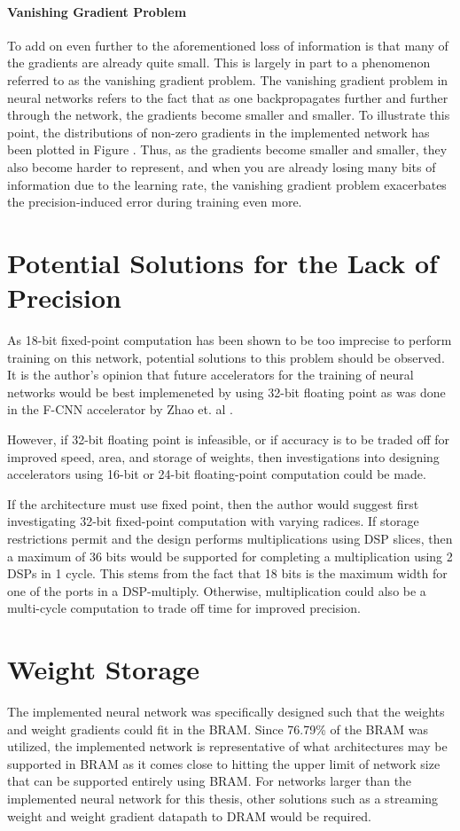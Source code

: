 \paragraph{Vanishing Gradient Problem}
To add on even further to the aforementioned loss of information is that many of the gradients are already quite small. This is largely in part to a phenomenon referred to as the vanishing gradient problem. The vanishing gradient problem in neural networks refers to the fact that as one backpropagates further and further through the network, the gradients become smaller and smaller. To illustrate this point, the distributions of non-zero gradients in the implemented network has been plotted in Figure . Thus, as the gradients become smaller and smaller, they also become harder to represent, and when you are already losing many bits of information due to the learning rate, the vanishing gradient problem exacerbates the precision-induced error during training even more.

\section{Potential Solutions for the Lack of Precision}
As 18-bit fixed-point computation has been shown to be too imprecise to perform training on this network, potential solutions to this problem should be observed. It is the author's opinion that future accelerators for the training of neural networks would be best implemeneted by using 32-bit floating point as was done in the F-CNN accelerator by Zhao et. al \cite{FCNN}. 

However, if 32-bit floating point is infeasible, or if accuracy is to be traded off for improved speed, area, and storage of weights, then investigations into designing accelerators using 16-bit or 24-bit floating-point computation could be made.

If the architecture must use fixed point, then the author would suggest first investigating 32-bit fixed-point computation with varying radices. If storage restrictions permit and the design performs multiplications using DSP slices, then a maximum of 36 bits would be supported for completing a multiplication using 2 DSPs in 1 cycle. This stems from the fact that 18 bits is the maximum width for one of the ports in a DSP-multiply. Otherwise, multiplication could also be a multi-cycle computation to trade off time for improved precision.

\section{Weight Storage}
The implemented neural network was specifically designed such that the weights and weight gradients could fit in the BRAM. Since 76.79\% of the BRAM was utilized, the implemented network is representative of what architectures may be supported in BRAM as it comes close to hitting the upper limit of network size that can be supported entirely using BRAM. For networks larger than the implemented neural network for this thesis, other solutions such as a streaming weight and weight gradient datapath to DRAM would be required. 


